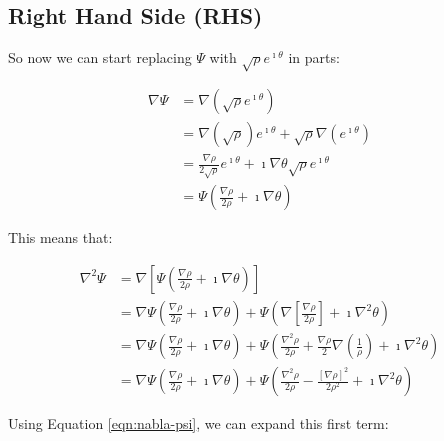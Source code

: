 
\subsection{Right Hand Side (RHS)}
\label{sec:schroedinger/rhs}

So now we can start replacing $\Psi$ with $\sqrt{\rho} e^{\imath \theta}$ in
parts:

\begin{align}
    \nabla \Psi &= \nabla \left( \sqrt{\rho} e^{\imath \theta} \right) \\
                &= \nabla \left( \sqrt{\rho} \right) e^{\imath \theta} +
    \sqrt{\rho} \nabla \left( e^{\imath \theta} \right) \\
    &= \frac{\nabla \rho}{2 \sqrt{\rho}} e^{\imath \theta} + \imath \nabla \theta
    \sqrt{\rho} e^{\imath \theta} \\
    &= \Psi \left( \frac{\nabla \rho}{2 \rho} + \imath \nabla \theta
    \right) \label{eqn:nabla-psi}
\end{align}

This means that:

\begin{align}
    \nabla^2 \Psi &= \nabla \left[ \Psi \left( \frac{\nabla \rho}{2 \rho} +
    \imath \nabla \theta \right) \right] \\
    &= \nabla \Psi \left( \frac{\nabla \rho}{2 \rho} + \imath \nabla \theta
        \right) + \Psi \left( \nabla \left[ \frac{\nabla \rho}{2 \rho} \right] +
        \imath \nabla^2 \theta \right) \\
    &= \nabla \Psi \left( \frac{\nabla \rho}{2 \rho} + \imath \nabla \theta
        \right) + \Psi \left( \frac{\nabla^2 \rho}{2 \rho} + \frac{\nabla
        \rho}{2} \nabla \left( \frac{1}{\rho} \right) +
        \imath \nabla^2 \theta \right) \\
    &= \nabla \Psi \left( \frac{\nabla \rho}{2 \rho} + \imath \nabla \theta
        \right) + \Psi \left( \frac{\nabla^2 \rho}{2 \rho} -
            \frac{ \left[ \nabla \rho \right]^2}{2\rho^2} +
        \imath \nabla^2 \theta \right) \label{eqn:nabla-squared-psi}
\end{align}

Using Equation \ref{eqn:nabla-psi}, we can expand this first term:

